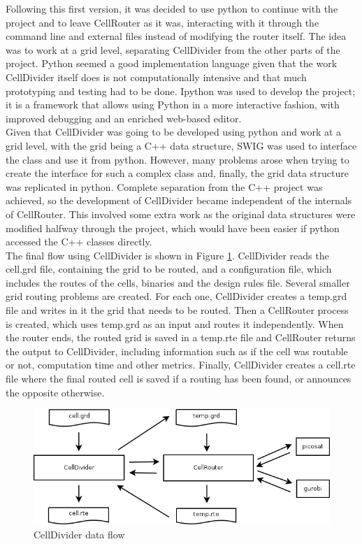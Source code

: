 Following this first version, it was decided to use python to continue with the project and to leave CellRouter as it was, interacting with it through the command line and external files instead of modifying the router itself. The idea was to work at a grid level, separating CellDivider from the other parts of the project. Python seemed a good implementation language given that the work CellDivider itself does is not computationally intensive and that much prototyping and testing had to be done. Ipython was used to develop the project; it is a framework that allows using Python in a more interactive fashion, with improved debugging and an enriched web-based editor. \\

Given that CellDivider was going to be developed using python and work at a grid level, with the grid being a C++ data structure, SWIG was used to interface the class and use it from python. However, many problems arose when trying to create the interface for such a complex class and, finally, the grid data structure was replicated in python. Complete separation from the C++ project was achieved, so the development of CellDivider became independent of the internals of CellRouter. This involved some extra work as the original data structures were modified halfway through the project, which would have been easier if python accessed the C++ classes directly. \\

The final flow using CellDivider is shown in Figure \ref{fig:pythonflow}. CellDivider reads the cell.grd file, containing the grid to be routed, and a configuration file, which includes the routes of the cells, binaries and the design rules file. Several smaller grid routing problems are created. For each one, CellDivider creates a temp.grd file and writes in it the grid that needs to be routed. Then a CellRouter process is created, which uses temp.grd as an input and routes it independently. When the router ends, the routed grid is saved in a temp.rte file and CellRouter returns the output to CellDivider, including information such as if the cell was routable or not, computation time and other metrics. Finally, CellDivider creates a cell.rte file where the final routed cell is saved if a routing has been found, or announces the opposite otherwise. \\

\begin{figure}[h!]
  \centering
  \includegraphics[scale=0.6]{img/design/pythonflow.png}
  \caption{CellDivider data flow}
  \label{fig:pythonflow}
\end{figure} 


